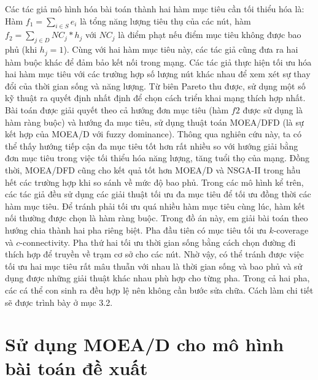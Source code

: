 \documentclass{article}
\begin{document}
Các tác giả mô hình hóa bài toán thành hai hàm mục tiêu cần tối thiểu hóa là: Hàm $f_1 = \sum_{i \in S}e_i$ là tổng năng lượng tiêu thụ của các nút, hàm $f_2 = \sum_{j \in D}NC_j * h_j$ với $NC_j$ là điểm phạt nếu điểm mục tiêu không được bao phủ (khi $h_j = 1$). Cùng với hai hàm mục tiêu này, các tác giả cũng đưa ra hai hàm buộc khác để đảm bảo kết nối trong mạng. Các tác giả thực hiện tối ưu hóa hai hàm mục tiêu với các trường hợp số lượng nút khác nhau để xem xét sự thay đổi của thời gian sống và năng lượng. Từ biên Pareto thu được, sử dụng một số kỹ thuật ra quyết định nhất định để chọn cách triển khai mạng thích hợp nhất. Bài toán được giải quyết theo cả hướng đơn mục tiêu (hàm $f2$ được sử dụng là hàm ràng buộc) và hướng đa mục tiêu, sử dụng thuật toán MOEA/DFD (là sự kết hợp của \gls{MOEA/D} với fuzzy dominance). Thông qua nghiên cứu này, ta có thể thấy hướng tiếp cận đa mục tiêu tốt hơn rất nhiều so với hướng giải bằng đơn mục tiêu trong việc tối thiểu hóa năng lượng, tăng tuổi thọ của mạng. Đồng thời, MOEA/DFD cũng cho kết quả tốt hơn \gls{MOEA/D} và \gls{NSGA-II} trong hầu hết các trường hợp khi so sánh về mức độ bao phủ.
\newline Trong các mô hình kể trên, các tác giả đều sử dụng các giải thuật tối ưu đa mục tiêu để tối ưu đồng thời các hàm mục tiêu. Để tránh phải tối ưu quá nhiều hàm mục tiêu cùng lúc, hàm kết nối thường được chọn là hàm ràng buộc. Trong đồ án này, em giải bài toán theo hướng chia thành hai pha riêng biệt. Pha đầu tiên có mục tiêu tối ưu $k$-coverage và $c$-connectivity. Pha thứ hai tối ưu thời gian sống bằng cách chọn đường đi thích hợp để truyền về trạm cơ sở cho các nút. Nhờ vậy, có thể tránh được việc tối ưu hai mục tiêu rất mâu thuẫn với nhau là thời gian sống và bao phủ và sử dụng được những giải thuật khác nhau phù hợp cho từng pha. Trong cả hai pha, các cá thể con sinh ra đều hợp lệ nên không cần bước sửa chữa. Cách làm chi tiết sẽ được trình bày ở mục 3.2.

\section{Sử dụng \gls{MOEA/D} cho mô hình bài toán đề xuất}
\end{document}
